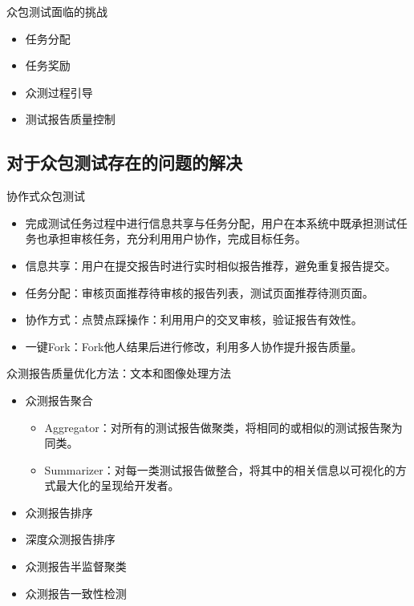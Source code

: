 众包测试面临的挑战
\vspace{-0.5em}
\begin{multicols}{2}
    \begin{itemize}
        \item 任务分配
        \item 任务奖励
        \item 众测过程引导
        \item 测试报告质量控制
    \end{itemize}
\end{multicols}
\vspace{-1em}

\subsection{对于众包测试存在的问题的解决}
协作式众包测试
\begin{itemize}
    \item 完成测试任务过程中进行信息共享与任务分配，用户在本系统中既承担测试任务也承担审核任务，充分利用用户协作，完成目标任务。
    \item 信息共享：用户在提交报告时进行实时相似报告推荐，避免重复报告提交。
    \item 任务分配：审核页面推荐待审核的报告列表，测试页面推荐待测页面。
    \item 协作方式：点赞点踩操作：利用用户的交叉审核，验证报告有效性。
    \item 一键Fork：Fork他人结果后进行修改，利用多人协作提升报告质量。
\end{itemize}

众测报告质量优化方法：文本和图像处理方法
\begin{itemize}
    \item 众测报告聚合
    \begin{itemize}
        \item Aggregator：对所有的测试报告做聚类，将相同的或相似的测试报告聚为同类。
        \item Summarizer：对每一类测试报告做整合，将其中的相关信息以可视化的方式最大化的呈现给开发者。
    \end{itemize}
    \item 众测报告排序
    \item 深度众测报告排序
    \item 众测报告半监督聚类
    \item 众测报告一致性检测
\end{itemize}


